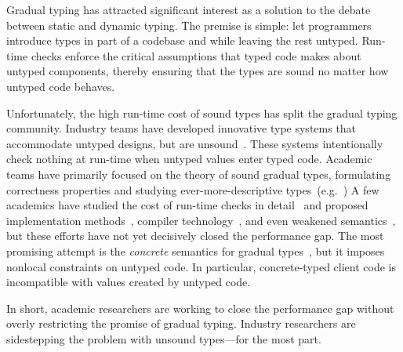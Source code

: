 \documentclass[english,cleveref,submission]{programming}
\begin{document}
Gradual typing has attracted significant interest as a solution to
the debate between static and dynamic typing.
The premise is simple: let programmers introduce types in part of a
codebase and while leaving the rest untyped.
Run-time checks enforce the critical assumptions that typed code makes about
untyped components, thereby ensuring that the types are sound no matter how
untyped code behaves.

Unfortunately, the high run-time cost of sound types has split
the gradual typing community.
Industry teams have developed innovative type systems that accommodate
untyped designs, but are unsound~\cite{bat-ecoop-2014,rch-popl-2012,cvgrl-oopsla-2017}.
These systems intentionally check nothing at run-time when untyped values enter
typed code.
Academic teams have primarily focused on the theory of sound
gradual types, formulating correctness properties and studying ever-more-descriptive
types~(e.g.~\cite{sgt-jfp-2016,clps-popl-2019,nla-popl-2019,mgt-oopsla-2021})
A few academics have studied the cost of run-time checks
in detail~\cite{tfgnvf-popl-2016,gtnffvf-jfp-2019}
and proposed implementation methods~\cite{kas-pldi-2019,bbst-oopsla-2017},
compiler technology~\cite{vsc-dls-2019,fgsfs-oopsla-2018},
and even weakened semantics~\cite{glfd-pj-2022,vss-popl-2017,gi-scp-2020},
but these efforts have not yet decisively closed the performance gap.
The most promising attempt is the \emph{concrete} semantics
for gradual types~\cite{clzv-ecoop-2018,mt-oopsla-2017,wzlov-popl-2010}, but it imposes nonlocal
constraints on untyped code.
In particular, concrete-typed client code is incompatible with
values created by untyped code.

In short, academic researchers are working to close the performance gap
without overly restricting the promise of gradual typing.
Industry researchers are sidestepping the problem with unsound types---for the most part.
\end{document}
